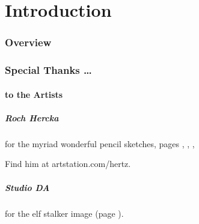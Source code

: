 \chapter*{Introduction}

\begin{multicols}{2}

\subsection*{Overview}

\subsection*{Special Thanks \ldots}

\subsubsection*{to the Artists}

\paragraph{Roch Hercka} for the myriad wonderful pencil sketches, pages 
\pageref{Roch_Hercka/five_races}, 
\pageref{Roch_Hercka/xp-1}, 
\pageref{Roch_Hercka/xp-2}, 

Find him at artstation.com/hertz.

\paragraph{Studio DA}
for the elf stalker image
(page \pageref{Studio_DA/elf_stalker}).

\end{multicols}
